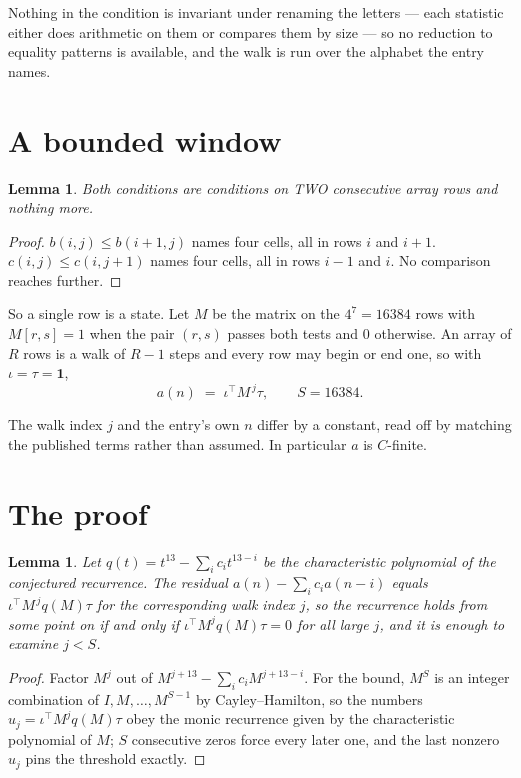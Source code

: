 \documentclass[11pt,a4paper]{article}
\theoremstyle{plain}
\newtheorem{lemma}[theorem]{Lemma}
\theoremstyle{definition}
\begin{document}
Nothing in the condition is invariant under renaming the letters --- each statistic either does
arithmetic on them or compares them by size --- so no reduction to equality patterns is
available, and the walk is run over the alphabet the entry names.

\section{A bounded window}

\begin{lemma}\label{lem:win}
Both conditions are conditions on TWO consecutive array rows and nothing more.
\end{lemma}

\begin{proof}
$b(i,j)\le b(i{+}1,j)$ names four cells, all in rows $i$ and $i+1$. $c(i,j)\le c(i,j{+}1)$
names four cells, all in rows $i-1$ and $i$. No comparison reaches further.
\end{proof}

So a single row is a state. Let $M$ be the matrix on the $4^{7}=16384$ rows with
$M[r,s]=1$ when the pair $(r,s)$ passes both tests and $0$ otherwise. An array of $R$ rows is a
walk of $R-1$ steps and every row may begin or end one, so with $\iota=\tau=\mathbf{1}$,
\[
a(n)\;=\;\iota^{\!\top}M^{\,j}\tau ,\qquad S=16384.
\]

The walk index $j$ and the entry's own $n$ differ by a constant, read off by matching the
published terms rather than assumed. In particular $a$ is $C$-finite.

\section{The proof}

\begin{lemma}\label{lem:crit}
Let $q(t)=t^{13}-\sum_i c_it^{13-i}$ be the characteristic polynomial of the
conjectured recurrence. The residual $a(n)-\sum_ic_ia(n-i)$ equals
$\iota^{\!\top}M^{\,j}q(M)\tau$ for the corresponding walk index $j$, so the recurrence
holds from some point on if and only if $\iota^{\!\top}M^{j}q(M)\tau=0$ for all large $j$,
and it is enough to examine $j<S$.
\end{lemma}

\begin{proof}
Factor $M^{j}$ out of $M^{j+13}-\sum_ic_iM^{j+13-i}$. For the bound, $M^{S}$
is an integer combination of $I,M,\dots,M^{S-1}$ by Cayley--Hamilton, so the numbers
$u_j=\iota^{\!\top}M^{j}q(M)\tau$ obey the monic recurrence given by the characteristic
polynomial of $M$; $S$ consecutive zeros force every later one, and the last nonzero $u_j$
pins the threshold exactly.
\end{proof}
\end{document}
